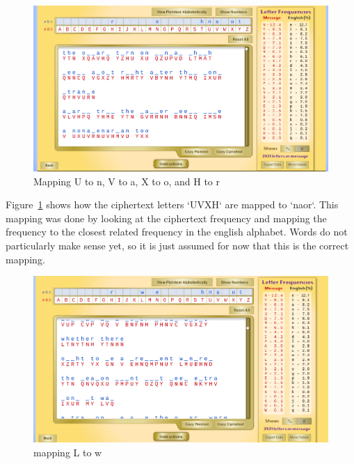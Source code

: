 \documentclass[12pt]{article}
\begin{document}
\begin{figure}[H]
    \begin{center}
        \includegraphics[scale=0.48]{c6.png}
    \end{center}{}
    \caption{Mapping U to n, V to a, X to o, and H to r}
    \label{fig:c6}
\end{figure}

Figure~\ref{fig:c6} shows how the ciphertext letters `UVXH` are mapped to `naor`. This mapping was done by looking at the
ciphertext frequency and mapping the frequency to the closest related frequency in the english alphabet. Words do not
particularly make sense yet, so it is just assumed for now that this is the correct mapping.



\begin{figure}[H]
    \begin{center}
        \includegraphics[scale=0.48]{c7.png}
    \end{center}{}
    \caption{mapping L to w}
    \label{fig:c7}
\end{figure}
\end{document}

